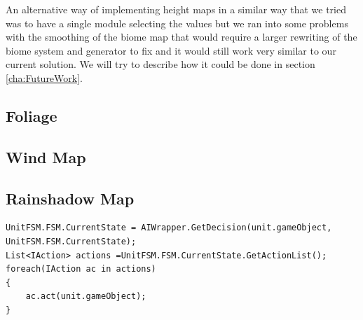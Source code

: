 An alternative way of implementing height maps in a similar way that we tried was to have a single module selecting the values but we ran into some problems with the smoothing of the biome map that would require a larger rewriting of the biome system and generator to fix and it would still work very similar to our current solution. We will try to describe how it could be done in section \ref{cha:FutureWork}.


\subsection{Foliage}

\subsection{Wind Map}
\label{windmap}
\subsection{Rainshadow Map}
\label{rainshadowmap}
\begin{lstlisting}[caption = The Update() call from the turn manager., label=code:aicall, language=Csharp]
UnitFSM.FSM.CurrentState = AIWrapper.GetDecision(unit.gameObject, UnitFSM.FSM.CurrentState);
List<IAction> actions =UnitFSM.FSM.CurrentState.GetActionList();
foreach(IAction ac in actions)
{
	ac.act(unit.gameObject);
}
\end{lstlisting}